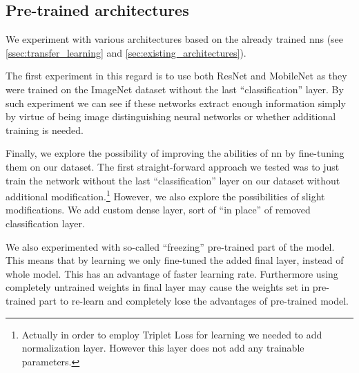 \subsection{Pre-trained architectures}

We experiment with various architectures based on the already trained \glspl{nn}
(see \autoref{ssec:transfer_learning} and \autoref{sec:existing_architectures}).

The first experiment in this regard is to use both ResNet and MobileNet as
they were trained on the ImageNet dataset without the last ``classification''
layer. By such experiment we can see if these networks extract enough
information simply by virtue of being image distinguishing neural networks
or whether additional training is needed.

Finally, we explore the possibility of improving the abilities of \gls{nn}
by fine-tuning them on our dataset. The first straight-forward approach
we tested was to just train the network without the last ``classification''
layer on our dataset without additional modification.\footnote{Actually in order
to employ Triplet Loss for learning we needed to add normalization layer.
However this layer does not add any trainable parameters.} However, we also
explore the possibilities of slight modifications. We add custom
dense layer, sort of ``in place'' of removed classification layer.

We also experimented with so-called ``freezing'' pre-trained part of the model.
This means that by learning we only fine-tuned the added final layer, instead
of whole model. This has an advantage of faster learning rate. Furthermore
using completely untrained weights in final layer may cause the weights set
in pre-trained part to re-learn and completely lose the advantages of
pre-trained model.


